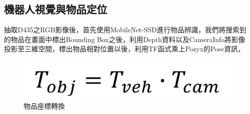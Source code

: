 \subsection{機器人視覺與物品定位}
抽取D435之RGB影像後，首先使用MobileNet-SSD進行物品辨識，我們將搜索到的物品在畫面中標出Bounding Box之後，利用Depth資料以及CameraInfo將影像投影至三維空間，標出物品相對位置以後，利用TF函式乘上Pozyx的Pose資訊，

\begin{figure}[h] %
  \centering
    \includegraphics[width=0.8\columnwidth]{images/tf.png}	
      \caption{物品座標轉換}
    \label{figure:tf}
\end{figure}